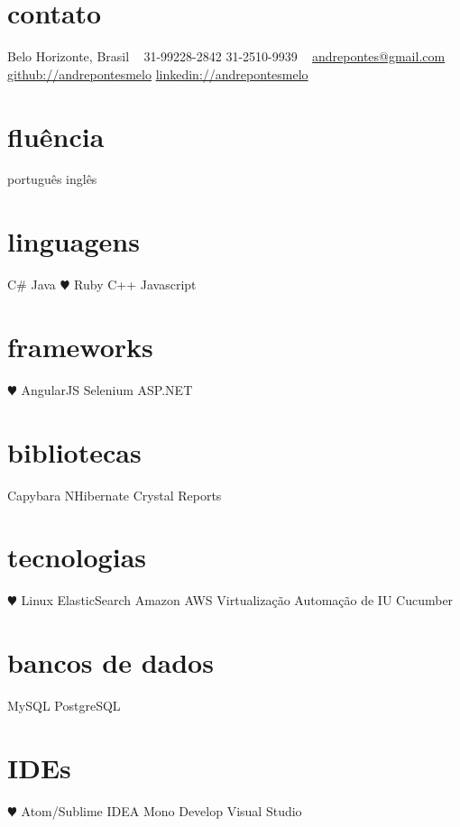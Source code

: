 \documentclass[]{friggeri-cv}
\begin{document}


\begin{aside}
\section{contato}
Belo Horizonte, Brasil
~
31-99228-2842
31-2510-9939
~
\href{mailto:andrepontes@gmail.com}{andrepontes@gmail.com}
\href{https://github.com/andrepontesmelo}{github://andrepontesmelo}
\href{https://br.linkedin.com/in/andrepontesmelo}{linkedin://andrepontesmelo}
\section{fluência}
português
inglês
\section{linguagens}
C\#
Java
{\color{red} $\varheartsuit$} Ruby
C++
Javascript
\section{frameworks}
 {\color{red} $\varheartsuit$} AngularJS
Selenium
ASP.NET
\section{bibliotecas}
Capybara
NHibernate
Crystal Reports
\section{tecnologias}
 {\color{red} $\varheartsuit$} Linux
ElasticSearch
Amazon AWS
Virtualização
Automação de IU
Cucumber
\section{bancos de dados}
MySQL
PostgreSQL
\section{IDEs}
{\color{red} $\varheartsuit$} Atom/Sublime
IDEA
Mono Develop
Visual Studio
\end{aside}
\end{document}
